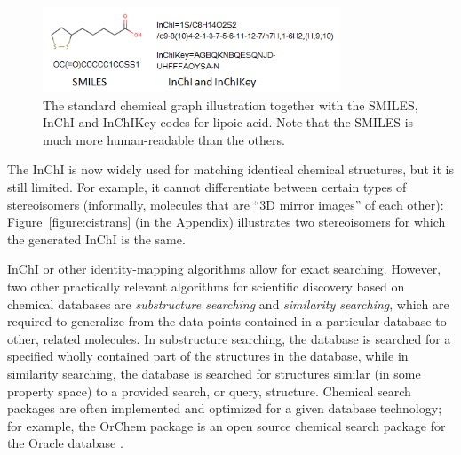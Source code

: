 \documentclass{sig-alternate}
\begin{document}
\begin{figure}
\centering
\includegraphics[height=1in]{lipoicacid.png}
\caption{The standard chemical graph illustration together with the
  SMILES, InChI and InChIKey codes for lipoic acid. Note that the
  SMILES is much more human-readable than the others.}
\label{figure:smiles}
\end{figure}

The InChI is now widely used for matching identical chemical
structures, but it is still limited. For example, it cannot
differentiate between certain types of stereoisomers (informally, molecules that are ``3D mirror images'' of each other):
Figure~\ref{figure:cistrans} (in the Appendix) illustrates two
stereoisomers for which the generated InChI is the same.

InChI or other identity-mapping algorithms allow for exact
searching. However, two other practically relevant algorithms for
scientific discovery based on chemical databases are
\emph{substructure searching} and \emph{similarity searching}, which
are required to generalize from the data points contained in a
particular database to other, related molecules. In substructure
searching, the database is searched for a specified wholly contained
part of the structures in the database, while in similarity searching,
the database is searched for structures similar (in some property
space) to a provided search, or query, structure. Chemical search
packages are often implemented and optimized for a given database
technology; for example, the OrChem package is an open source chemical
search package for the Oracle database \cite{rijnbeek2009}.
\end{document}
